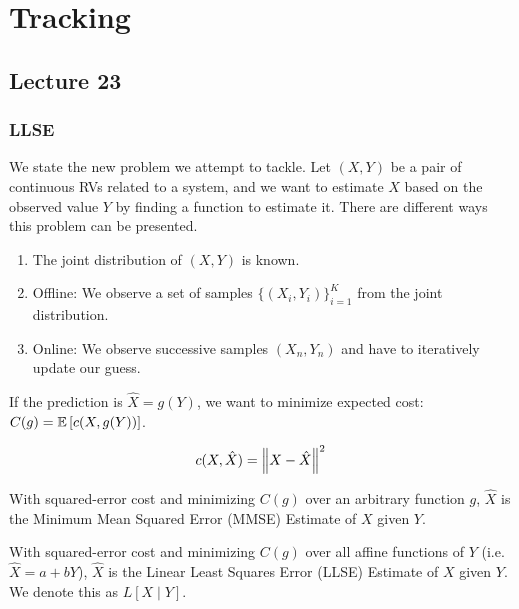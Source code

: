 \section{Tracking}
\subsection{Lecture 23}
\subsubsection{LLSE}

We state the new problem we attempt to tackle. Let $(X, Y)$ be a pair of continuous RVs related to a system, and
we want to estimate $X$ based on the observed value $Y$ by finding a function to estimate it. There are different ways this problem can be presented.
\begin{enumerate}
    \item The joint distribution of $(X, Y)$ is known.
    \item Offline: We observe a set of samples $\{(X_i, Y_i)\}_{i = 1}^K$ from the joint distribution.
    \item Online: We observe successive samples $(X_n, Y_n)$ and have to iteratively update our guess.
\end{enumerate}

If the prediction is $\hat{X} = g(Y)$, we want to minimize expected cost: $C(g) = \mathbb{E}\left[ c(X, g(Y)) \right]$.

\begin{definition}
    \[ c(X, \hat{X}) = \norm{X - \hat{X}}^2 \]
\end{definition}

\begin{definition}[MMSE]
    With squared-error cost and minimizing $C(g)$ over an arbitrary function $g$, $\hat{X}$ is the Minimum Mean Squared Error (MMSE) Estimate of $X$ given $Y$.
\end{definition}

\begin{definition}[LLSE]
    With squared-error cost and minimizing $C(g)$ over all affine functions of $Y$ (i.e. $\hat{X} = a + bY$), $\hat{X}$ is the Linear Least Squares Error (LLSE) Estimate of $X$ given $Y$.
    We denote this as $L[X \mid Y]$.
\end{definition}

